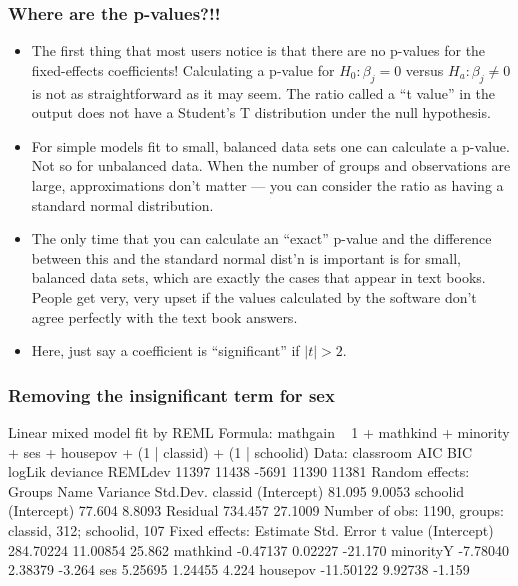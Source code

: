 \begin{frame}
  \frametitle{Where are the p-values?!!}
  \begin{itemize}
  \item The first thing that most users notice is that there are no
    p-values for the fixed-effects coefficients!  Calculating a p-value
    for $H_0:\beta_j=0$ versus $H_a:\beta_j\ne0$ is not as
    straightforward as it may seem.  The ratio called a ``t value'' in
    the output does not have a Student's T distribution under the null
    hypothesis.
  \item For simple models fit to small, balanced data sets one can
    calculate a p-value.  Not so for unbalanced data.  When the number
    of groups and observations are large, approximations don't matter
    --- you can consider the ratio as having a standard normal
    distribution.
  \item The only time that you can calculate an ``exact'' p-value
    and the difference between this and the standard normal dist'n is
    important is for small, balanced data sets, which are
    exactly the cases that appear in text books.  People get very,
    very upset if the values calculated by the software don't agree
    perfectly with the text book answers.
  \item Here, just say a coefficient is ``significant'' if $|t|> 2$.
  \end{itemize}
\end{frame}

\begin{frame}[fragile]
  \frametitle{Removing the insignificant term for sex}
\begin{Schunk}
\begin{Soutput}
Linear mixed model fit by REML 
Formula: mathgain ~ 1 + mathkind + minority + ses + housepov + (1 | classid) +      (1 | schoolid) 
   Data: classroom 
   AIC   BIC logLik deviance REMLdev
 11397 11438  -5691    11390   11381
Random effects:
 Groups   Name        Variance Std.Dev.
 classid  (Intercept)  81.095   9.0053 
 schoolid (Intercept)  77.604   8.8093 
 Residual             734.457  27.1009 
Number of obs: 1190, groups: classid, 312; schoolid, 107
Fixed effects:
             Estimate Std. Error t value
(Intercept) 284.70224   11.00854  25.862
mathkind     -0.47137    0.02227 -21.170
minorityY    -7.78040    2.38379  -3.264
ses           5.25695    1.24455   4.224
housepov    -11.50122    9.92738  -1.159
\end{Soutput}
\end{Schunk}
\end{frame}

